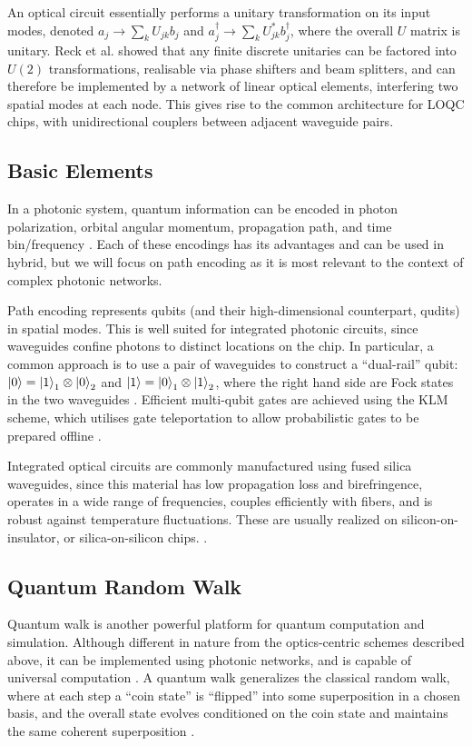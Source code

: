 An optical circuit essentially performs a unitary transformation on its input modes, denoted $a_j \rightarrow \sum_k U_{jk}b_j$ and $a_j^\dagger \rightarrow \sum_k U^*_{jk}b_j^\dagger$, where the overall $U$ matrix is unitary. Reck et al. \cite{Rb1994} showed that any finite discrete unitaries can be factored into $U(2)$ transformations, realisable via phase shifters and beam splitters, and can therefore be implemented by a network of linear optical elements, interfering two spatial modes at each node. This gives rise to the common architecture for LOQC chips, with unidirectional couplers between adjacent waveguide pairs. 

\subsection{Basic Elements}
In a photonic system, quantum information can be encoded in photon polarization, orbital angular momentum, propagation path, and time bin/frequency \cite{Flamini2018}.
Each of these encodings has its advantages and can be used in hybrid, but we will focus on path encoding as it is most relevant to the context of complex photonic networks.

Path encoding represents qubits (and their high-dimensional counterpart, qudits) in spatial modes. This is well suited for integrated photonic circuits, since waveguides confine photons to distinct locations on the chip. In particular, a common approach is to use a pair of waveguides to construct a ``dual-rail'' qubit: $\ket{0} = \ket 1_1 \otimes \ket 0_2$ and $\ket{1} = \ket 0_1 \otimes \ket 1_2$, where the right hand side are Fock states in the two waveguides \cite{Kok2005,Shadbolt2012a}. Efficient multi-qubit gates are achieved using the KLM scheme, which utilises gate teleportation to allow probabilistic gates to be prepared offline \cite{Knill2001}.

Integrated optical circuits are commonly manufactured using fused silica waveguides, since this material has low propagation loss and birefringence, operates in a wide range of frequencies, couples efficiently with fibers, and is robust against temperature fluctuations. These are usually realized on silicon-on-insulator, or silica-on-silicon chips. \cite{Flamini2018}.

\subsection{Quantum Random Walk}
Quantum walk is another powerful platform for quantum computation and simulation. Although different in nature from the optics-centric schemes described above, it can be implemented using photonic networks, and is capable of universal computation \cite{Childs2009}. A quantum walk generalizes the classical random walk, where at each step a ``coin state'' is ``flipped'' into some superposition in a chosen basis, and the overall state evolves conditioned on the coin state and maintains the same coherent superposition \cite{Innocenti2017}. 

